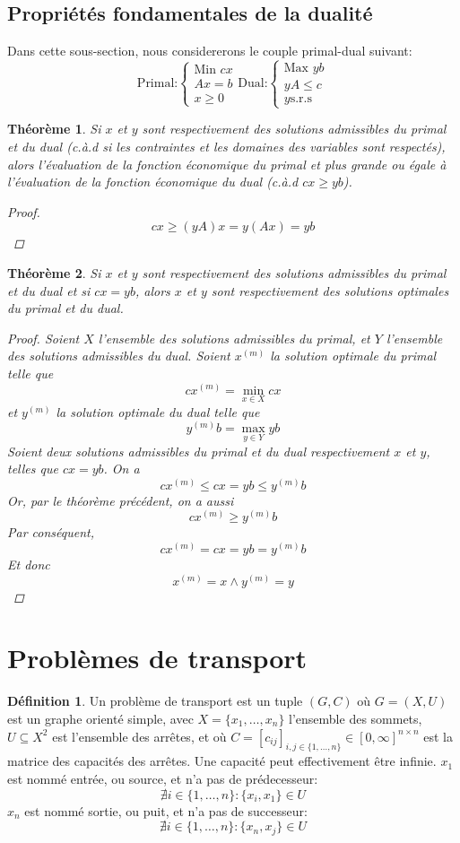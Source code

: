 \documentclass[a4paper]{report}
\theoremstyle{definition}
\newtheorem*{definition}{Définition}
\theoremstyle{remark}
\theoremstyle{plain}
\newtheorem{theorem}{Théorème}
\begin{document}
\subsection{Propriétés fondamentales de la dualité}
Dans cette sous-section, nous considererons le couple primal-dual suivant:
\[\text{Primal:}
\begin{cases}
	\text{Min } cx \\
	Ax=b \\
	x \ge 0
\end{cases}
\text{Dual:}\begin{cases}
\text{Max } yb\\
yA\le c\\
y\text{s.r.s}
\end{cases}\]

\begin{theorem}
Si \(x\) et \(y\) sont respectivement des solutions admissibles du primal et du
dual (c.à.d si les contraintes et les domaines des variables sont respectés),
alors l'évaluation de la fonction économique du primal et plus grande ou
égale à l'évaluation de la fonction économique du dual (c.à.d \(cx\ge yb\)).
\begin{proof}
\[cx\ge (yA)x=y(Ax)=yb\]
\end{proof}
\end{theorem}

\begin{theorem}
Si \(x\) et \(y\) sont respectivement des solutions admissibles du primal et du
dual et si \(cx=yb\), alors \(x\) et \(y\) sont respectivement des solutions
optimales du primal et du dual.
\begin{proof}
Soient \(X\) l'ensemble des solutions admissibles du primal, et \(Y\) l'ensemble
des solutions admissibles du dual. Soient \(x^{(m)}\) la solution optimale du
primal telle que
\[cx^{(m)}=\min_{x\in X}cx\]
et \(y^{(m)}\) la solution optimale du dual telle que
\[y^{(m)}b=\max_{y\in Y}yb\]
Soient deux solutions admissibles du primal et du dual respectivement \(x\) et
\(y\), telles que \(cx=yb\). On a
\[cx^{(m)}\le cx=yb\le y^{(m)}b\]
Or, par le théorème précédent, on a aussi
\[cx^{(m)}\ge y^{(m)}b\]
Par conséquent,
\[cx^{(m)}=cx=yb=y^{(m)}b\]
Et donc
\[x^{(m)}=x\land y^{(m)}=y\]
\end{proof}
\end{theorem}

\section{Problèmes de transport}
\begin{definition}
Un problème de transport est un tuple \((G,C)\) où \(G=(X,U)\) est un graphe
orienté simple, avec \(X=\{x_1,\dots,x_n\}\) l'ensemble des sommets,
\(U\subseteq X^2\) est l'ensemble des arrêtes, et où
\(C=[c_{ij}]_{i,j\in\{1,\dots,n\}}\in [0,\infty]^{n\times n}\) est la matrice
des capacités des arrêtes. Une capacité peut effectivement être infinie.
\(x_1\) est nommé entrée, ou source, et n'a pas de prédecesseur:
\[\nexists i\in\{1,\dots,n\}:\{x_i,x_1\}\in U\]
\(x_n\) est nommé sortie, ou puit, et n'a pas de successeur:
\[\nexists i\in\{1,\dots,n\}:\{x_n,x_j\}\in U\]
\end{definition}
\end{document}

